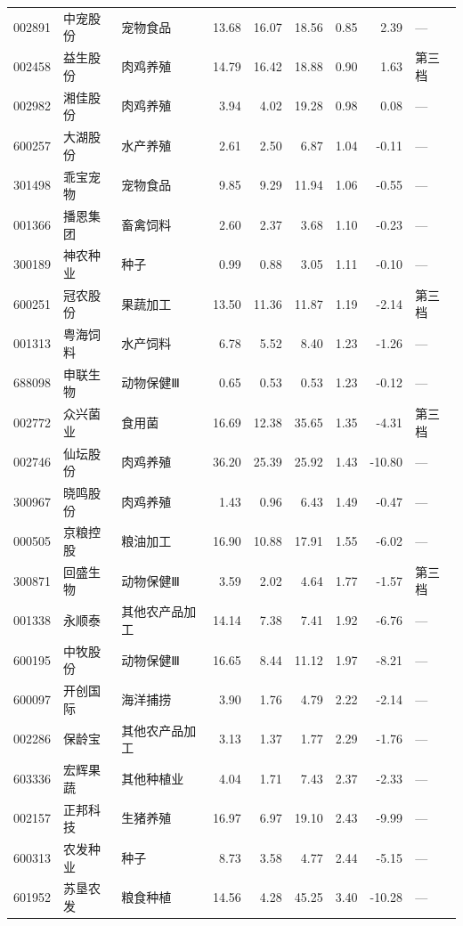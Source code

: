\begin{longtable}{@{}llp{1.9cm}rrrrrl@{}}
002891 & 中宠股份 & 宠物食品 & 13.68 & 16.07 & 18.56 & 0.85 & 2.39 & --- \\
002458 & 益生股份 & 肉鸡养殖 & 14.79 & 16.42 & 18.88 & 0.90 & 1.63 & 第三档 \\
002982 & 湘佳股份 & 肉鸡养殖 & 3.94 & 4.02 & 19.28 & 0.98 & 0.08 & --- \\
600257 & 大湖股份 & 水产养殖 & 2.61 & 2.50 & 6.87 & 1.04 & -0.11 & --- \\
301498 & 乖宝宠物 & 宠物食品 & 9.85 & 9.29 & 11.94 & 1.06 & -0.55 & --- \\
001366 & 播恩集团 & 畜禽饲料 & 2.60 & 2.37 & 3.68 & 1.10 & -0.23 & --- \\
300189 & 神农种业 & 种子 & 0.99 & 0.88 & 3.05 & 1.11 & -0.10 & --- \\
600251 & 冠农股份 & 果蔬加工 & 13.50 & 11.36 & 11.87 & 1.19 & -2.14 & 第三档 \\
001313 & 粤海饲料 & 水产饲料 & 6.78 & 5.52 & 8.40 & 1.23 & -1.26 & --- \\
688098 & 申联生物 & 动物保健Ⅲ & 0.65 & 0.53 & 0.53 & 1.23 & -0.12 & --- \\
002772 & 众兴菌业 & 食用菌 & 16.69 & 12.38 & 35.65 & 1.35 & -4.31 & 第三档 \\
002746 & 仙坛股份 & 肉鸡养殖 & 36.20 & 25.39 & 25.92 & 1.43 & -10.80 & --- \\
300967 & 晓鸣股份 & 肉鸡养殖 & 1.43 & 0.96 & 6.43 & 1.49 & -0.47 & --- \\
000505 & 京粮控股 & 粮油加工 & 16.90 & 10.88 & 17.91 & 1.55 & -6.02 & --- \\
300871 & 回盛生物 & 动物保健Ⅲ & 3.59 & 2.02 & 4.64 & 1.77 & -1.57 & 第三档 \\
001338 & 永顺泰 & 其他农产品加工 & 14.14 & 7.38 & 7.41 & 1.92 & -6.76 & --- \\
600195 & 中牧股份 & 动物保健Ⅲ & 16.65 & 8.44 & 11.12 & 1.97 & -8.21 & --- \\
600097 & 开创国际 & 海洋捕捞 & 3.90 & 1.76 & 4.79 & 2.22 & -2.14 & --- \\
002286 & 保龄宝 & 其他农产品加工 & 3.13 & 1.37 & 1.77 & 2.29 & -1.76 & --- \\
603336 & 宏辉果蔬 & 其他种植业 & 4.04 & 1.71 & 7.43 & 2.37 & -2.33 & --- \\
002157 & 正邦科技 & 生猪养殖 & 16.97 & 6.97 & 19.10 & 2.43 & -9.99 & --- \\
600313 & 农发种业 & 种子 & 8.73 & 3.58 & 4.77 & 2.44 & -5.15 & --- \\
601952 & 苏垦农发 & 粮食种植 & 14.56 & 4.28 & 45.25 & 3.40 & -10.28 & --- \\

\end{longtable}
